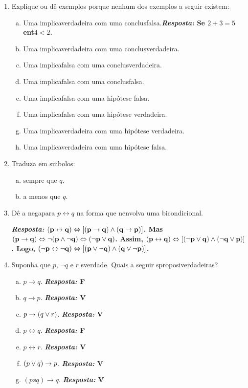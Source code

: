 \begin{enumerate}[{\bf 1.}]
\item Explique ou d\^e exemplos porque nenhum dos exemplos a seguir existem:
\begin{enumerate}[a)]
\item Uma implica\cao verdadeira com uma conclus\ao falsa.{\bf{\it Resposta:} Se $2+3=5$ ent\ao $4<2$.}
\item Uma implica\cao verdadeira com uma conclus\ao verdadeira.
\item Uma implica\cao falsa com uma conclus\ao verdadeira.
\item Uma implica\cao falsa com uma conclus\ao falsa.
\item Uma implica\cao falsa com uma hip\'otese falsa.
\item Uma implica\cao falsa com uma hip\'otese verdadeira.
\item Uma implica\cao verdadeira com uma hip\'otese verdadeira.
\item Uma implica\cao verdadeira com uma hip\'otese falsa. 
\end{enumerate}

\item Traduza em s\ih mbolos:
\begin{enumerate}[a)]
\item \pp sempre que $q$.
\item \pp a menos que $q$.
\end{enumerate}

\item D\^e a nega\cao para $p \leftrightarrow q$ na forma que n\ao envolva uma bicondicional.

{\bf{\it Resposta:} ${\bf (p\leftrightarrow q)\Leftrightarrow [(p\to q)\wedge(q\to p)]}$. Mas ${\bf (p\to q)\Leftrightarrow \lnot(p \wedge \lnot q)\Leftrightarrow(\lnot p\vee q)}$. Assim, ${\bf (p\leftrightarrow q)\Leftrightarrow[(\lnot p\vee q)\wedge(\lnot q\vee p)]}$. Logo, ${\bf (\lnot p\leftrightarrow\lnot q)\Leftrightarrow[(p\vee \lnot q)\wedge(q\vee \lnot p)]}$.}

\item Suponha que $p$, $\lnot q$ e $r$ s\ao verdade. Quais a seguir s\ao proposi\coes verdadeiras?
\begin{enumerate}[a)]
\item $p \to q$. {\bf{\it Resposta:} F}
\item $q \to p$. {\bf{\it Resposta:} V}
\item $p \to (q \vee r)$. {\bf{\it Resposta:} V}
\item $p \leftrightarrow q$. {\bf{\it Resposta:} F}
\item $p \leftrightarrow r$. {\bf{\it Resposta:} V}
\item $(p \vee q) \to p$. {\bf{\it Resposta:} V}
\item $(p \ee q) \to q$. {\bf{\it Resposta:} V}
\end{enumerate}


\end{enumerate}
